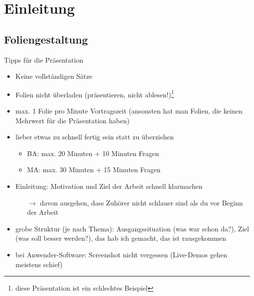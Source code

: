\section{Einleitung}

\subsection{Foliengestaltung}

\begin{frame}{Tipps für die Präsentation}
\begin{itemize}
\item Keine vollständigen Sätze
\item Folien nicht überladen (präsentieren, nicht ablesen!)\footnote{diese Präsentation ist ein schlechtes Beispiel}
\item max. 1 Folie pro Minute Vortragszeit (ansonsten hat man Folien, die keinen Mehrwert für die Präsentation haben)
\item lieber etwas zu schnell fertig sein statt zu überziehen
\begin{itemize}
    \item BA: max. 20 Minuten + 10 Minuten Fragen
    \item MA: max. 30 Minuten + 15 Minuten Fragen
\end{itemize}
\item Einleitung: Motivation und Ziel der Arbeit schnell klarmachen
\begin{itemize}
    \item[$\rightarrow$] davon ausgehen, dass Zuhörer nicht schlauer sind als du vor Beginn der Arbeit
\end{itemize}
\item grobe Struktur (je nach Thema): Ausgangssituation (was war schon da?), Ziel (was soll besser werden?), das hab ich gemacht, das ist rausgekommen
\item bei Anwender-Software: Screenshot nicht vergessen (Live-Demos gehen meistens schief)
\end{itemize}
\end{frame}

